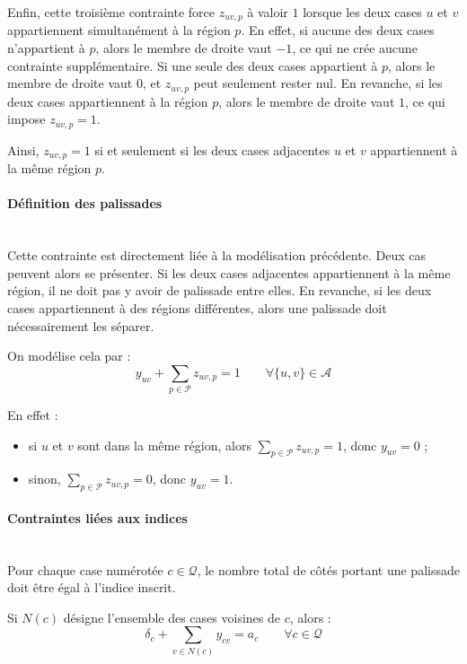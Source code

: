 Enfin, cette troisième contrainte force \(z_{uv,p}\) à valoir \(1\) lorsque les deux cases \(u\) et \(v\) appartiennent simultanément à la région \(p\). En effet, si aucune des deux cases n'appartient à \(p\), alors le membre de droite vaut \(-1\), ce qui ne crée aucune contrainte supplémentaire. Si une seule des deux cases appartient à \(p\), alors le membre de droite vaut \(0\), et \(z_{uv,p}\) peut seulement rester nul. En revanche, si les deux cases appartiennent à la région \(p\), alors le membre de droite vaut \(1\), ce qui impose \(z_{uv,p} = 1\).

Ainsi, \(z_{uv,p} = 1\) si et seulement si les deux cases adjacentes \(u\) et \(v\) appartiennent à la même région \(p\).

\paragraph{Définition des palissades}
\mbox{}\\

Cette contrainte est directement liée à la modélisation précédente. Deux cas peuvent alors se présenter. Si les deux cases adjacentes appartiennent à la même région, il ne doit pas y avoir de palissade entre elles. En revanche, si les deux cases appartiennent à des régions différentes, alors une palissade doit nécessairement les séparer.

On modélise cela par :
\[
y_{uv} + \sum_{p \in \mathcal{P}} z_{uv,p} = 1
\qquad \forall \{u,v\} \in \mathcal{A}
\]

En effet :
\begin{itemize}
    \item si \(u\) et \(v\) sont dans la même région, alors \(\sum_{p \in \mathcal{P}} z_{uv,p} = 1\), donc \(y_{uv} = 0\) ;
    \item sinon, \(\sum_{p \in \mathcal{P}} z_{uv,p} = 0\), donc \(y_{uv} = 1\).
\end{itemize}

\paragraph{Contraintes liées aux indices}
\mbox{}\\

Pour chaque case numérotée \(c \in \mathcal{Q}\), le nombre total de côtés portant une palissade doit être égal à l'indice inscrit.

Si \(N(c)\) désigne l'ensemble des cases voisines de \(c\), alors :
\[
\delta_c + \sum_{v \in N(c)} y_{cv} = a_c
\qquad \forall c \in \mathcal{Q}
\]

